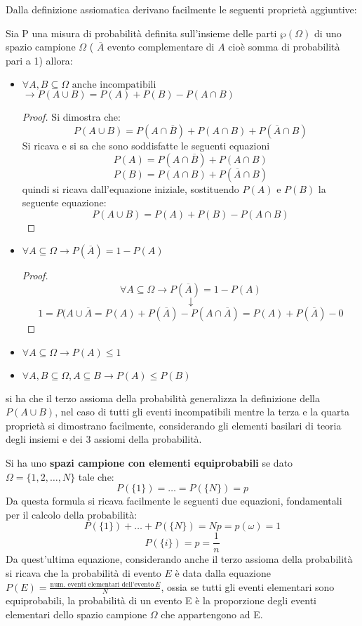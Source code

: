 \documentclass[a4paper,12pt, oneside]{book}
\begin{document}
Dalla definizione assiomatica derivano facilmente le seguenti proprietà aggiuntive:
\begin{definizione}
Sia P una misura di probabilità definita sull'insieme delle parti $\wp(\Omega)$ di uno
spazio campione $\Omega$ ( $\overline{A}$ evento complementare di $A$ cioè somma di probabilità
pari a 1) allora:
    \begin{itemize}
        \item $\forall A,B\subseteq \Omega \mbox{ anche incompatibili }$\\ $\to P(A\cup B)=P(A)+P(B)-P(A\cap B)$
                \begin{proof}
                 Si dimostra che:
                \[ P(A \cup B) = P(A \cap \overline{B}) + P(A \cap B) + P(\overline{A} \cap B)\]
                 Si ricava e si sa che sono soddisfatte le seguenti equazioni
                 \[P(A) = P(A \cap \overline{B}) + P(A \cap B) \]
                 \[P(B) = P(A \cap B) + P(\overline{A} \cap B) \]
                        quindi si ricava dall'equazione iniziale, sostituendo $P(A)$ e $P(B)$ la seguente equazione:
                    \[P(A \cup B) = P(A) + P(B) - P(A \cap B)\]
                \end{proof}
        \item $\forall A\subseteq \Omega \to P(\overline{A})=1-P(A)$
              \begin{proof}
                    \[  \forall A\subseteq \Omega \to P(\overline{A})=1-P(A)\]
                        \[\downarrow\]
                    \[ 1 = P(A \cup \overline{A} = P(A) + P(\overline{A}) - P(A \cap \overline{A}) = P(A) + P(\overline{A}) - 0\]
              \end{proof}
        \item $\forall A\subseteq \Omega \to P(A)\leq 1$
        \item $\forall A,B\subseteq \Omega, A\subseteq B \to P(A)\leq P(B)$
    \end{itemize}
\end{definizione}
si ha che il terzo assioma della probabilità generalizza la definizione della $P(A \cup B)$,
nel caso di tutti gli eventi incompatibili mentre la terza e la quarta proprietà si dimostrano facilmente,
considerando gli elementi basilari di teoria degli insiemi e dei 3 assiomi della probabilità.

Si ha uno \textbf{spazi campione con elementi equiprobabili} se dato $\Omega = \{1, 2, \dots, N\}$ tale che:
\[P(\{1\}) = \dots = P(\{N\}) = p \]
Da questa formula si ricava facilmente le seguenti due equazioni, fondamentali per il calcolo della probabilità:
\[P(\{1\}) + \dots + P(\{N\}) = Np = p(\omega) = 1\]
\[P(\{i\}) = p = \frac{1}{n}\]
Da quest'ultima equazione, considerando anche il terzo assioma della probabilità si ricava che la probabilità
di evento $E$ è data dalla equazione $P(E) = \frac{\mbox{num. eventi elementari dell'evento} \, E}{N}$,
ossia se tutti gli eventi elementari sono equiprobabili, la probabilità di un evento E è
la proporzione degli eventi elementari dello spazio campione $\Omega$ che appartengono ad E.
\end{document}
